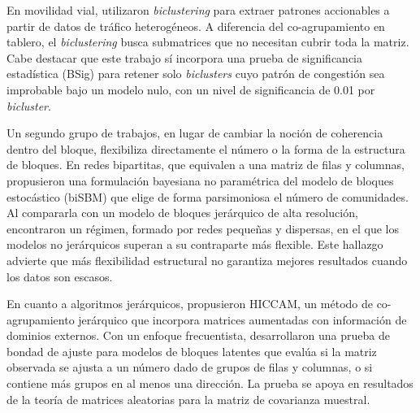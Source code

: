 En movilidad vial, \cite{Neves2022} utilizaron \emph{biclustering} para extraer
patrones accionables a partir de datos de tráfico heterogéneos. A diferencia
del co-agrupamiento en tablero, el \emph{biclustering} busca submatrices que no
necesitan cubrir toda la matriz. Cabe destacar que este trabajo sí
incorpora una prueba de significancia estadística (BSig) para retener solo
\emph{biclusters} cuyo patrón de congestión sea improbable bajo un modelo nulo,
con un nivel de significancia de 0.01 por \emph{bicluster}.

Un segundo grupo de trabajos, en lugar de cambiar la noción de coherencia
dentro del bloque, flexibiliza directamente el número o la forma de la
estructura de bloques. En redes bipartitas, que equivalen a una matriz de
filas y columnas, \cite{Yen2020} propusieron una formulación bayesiana no
paramétrica del modelo de bloques estocástico (biSBM) que elige de forma
parsimoniosa el número de comunidades. Al compararla con un modelo de
bloques jerárquico de alta resolución, encontraron un régimen,
formado por redes pequeñas y dispersas, en el que los modelos no
jerárquicos superan a su contraparte más flexible. Este hallazgo advierte
que más flexibilidad estructural no garantiza mejores resultados cuando los
datos son escasos.

En cuanto a algoritmos jerárquicos, \cite{Sugahara2023} propusieron HICCAM,
un método de co-agrupamiento jerárquico que incorpora matrices aumentadas
con información de dominios externos. Con un enfoque frecuentista,
\cite{Watanabe2021gof} desarrollaron una prueba de bondad de ajuste para
modelos de bloques latentes que evalúa si la matriz observada se ajusta a un
número dado de grupos de filas y columnas, o si contiene más grupos en al
menos una dirección. La prueba se apoya en resultados de la teoría de
matrices aleatorias para la matriz de covarianza muestral.

